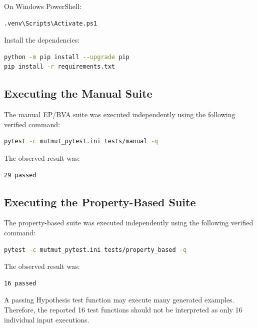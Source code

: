 \documentclass[12pt]{article}
\begin{document}
On Windows PowerShell:

\begin{lstlisting}[language=bash,caption={Activating the environment on Windows}]
.venv\Scripts\Activate.ps1
\end{lstlisting}

Install the dependencies:

\begin{lstlisting}[language=bash,caption={Installing project dependencies}]
python -m pip install --upgrade pip
pip install -r requirements.txt
\end{lstlisting}

\subsection{Executing the Manual Suite}

The manual EP/BVA suite was executed independently using the following
verified command:

\begin{lstlisting}[language=bash,caption={Executing the manual EP/BVA suite}]
pytest -c mutmut_pytest.ini tests/manual -q
\end{lstlisting}

The observed result was:

\begin{verbatim}
29 passed
\end{verbatim}

\subsection{Executing the Property-Based Suite}

The property-based suite was executed independently using the following
verified command:

\begin{lstlisting}[language=bash,caption={Executing the property-based suite}]
pytest -c mutmut_pytest.ini tests/property_based -q
\end{lstlisting}

The observed result was:

\begin{verbatim}
16 passed
\end{verbatim}

A passing Hypothesis test function may execute many generated examples.
Therefore, the reported 16 test functions should not be interpreted as only
16 individual input executions.
\end{document}
